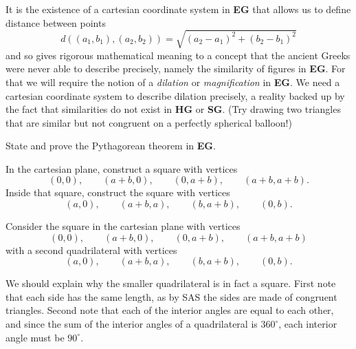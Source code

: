 \documentclass{ximera}
\begin{document}
It is the existence of a cartesian coordinate system in \textbf{EG} that
allows us to define distance between points%
\[
d\left( (a_{1},b_{1}), (a_{2},b_{2}) \right)
=\sqrt{(a_{2}-a_{1})^{2}+(b_{2}-b_{1})^{2}}
\]
and so gives rigorous mathematical meaning to a concept that the
ancient Greeks were never able to describe precisely, namely the
similarity of figures in \textbf{EG}. For that we will require the
notion of a \textit{dilation} or \textit{magnification} in
\textbf{EG}. We need a cartesian coordinate system to describe
dilation precisely, a reality backed up by the fact that similarities
do not exist in \textbf{HG} or \textbf{SG}. (Try drawing two triangles
that are similar but not congruent on a perfectly spherical balloon!)

\begin{question}
State and prove the Pythagorean theorem in \textbf{EG}.
\begin{solution}
\begin{hint}
In the cartesian plane, construct a square with vertices
\[
\left(0,0\right),\qquad \left(a+b,0\right),\qquad \left(0,a+b\right), \qquad \left( a+b,a+b\right).
\] 
Inside that square, construct the square with vertices 
\[
\left(a,0\right),\qquad \left(a+b,a\right),\qquad \left(b,a+b\right), \qquad \left(0,b\right).
\]
\end{hint}
\begin{freeResponse}
Consider the square in the cartesian plane with vertices
\[
\left(0,0\right),\qquad \left(a+b,0\right),\qquad \left(0,a+b\right),
\qquad \left( a+b,a+b\right)
\]
with a second quadrilateral with vertices
\[
\left(a,0\right),\qquad \left(a+b,a\right),\qquad \left(b,a+b\right), \qquad \left(0,b\right).
\]
\begin{image}
\end{image}
We should explain why the smaller quadrilateral is in fact a
square. First note that each side has the same length, as by SAS the
sides are made of congruent triangles. Second note that each of the
interior angles are equal to each other, and since the sum of the
interior angles of a quadrilateral is $360^\circ$, each interior angle
must be $90^\circ$.


\end{freeResponse}
\end{solution}
\end{question}
\end{document}
